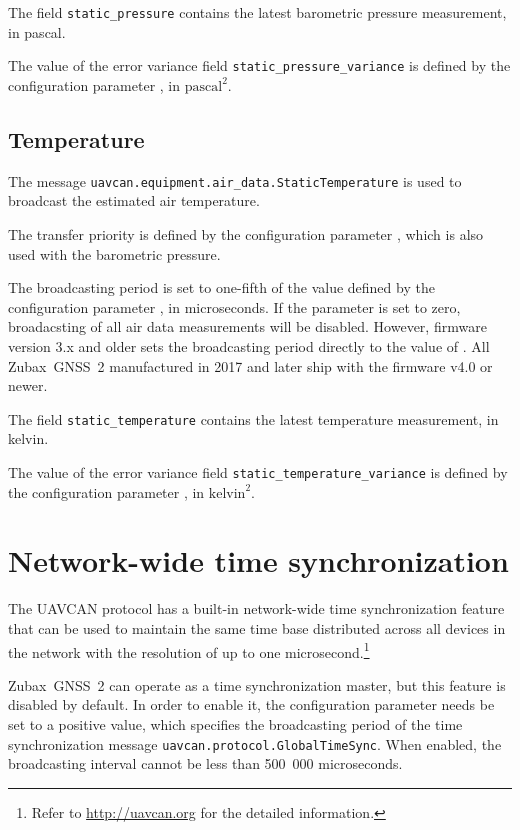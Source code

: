 \documentclass{zubaxdoc}
\begin{document}
The field \verb|static_pressure| contains the latest barometric pressure measurement, in pascal.

The value of the error variance field \verb|static_pressure_variance| is defined by the configuration
parameter , in $\text{pascal}^2$.

\subsection{Temperature}

The message \verb|uavcan.equipment.air_data.StaticTemperature| is used to broadcast the
estimated air temperature.

The transfer priority is defined by the configuration parameter ,
which is also used with the barometric pressure.

The broadcasting period is set to one-fifth of the value defined by the configuration
parameter , in microseconds.
If the parameter is set to zero, broadacsting of all air data measurements will be disabled.
However, firmware version 3.x and older sets the broadcasting period directly to the value
of .
All Zubax~GNSS~2 manufactured in 2017 and later ship with the firmware v4.0 or newer.

The field \verb|static_temperature| contains the latest temperature measurement, in kelvin.

The value of the error variance field \verb|static_temperature_variance| is defined by the configuration
parameter , in $\text{kelvin}^2$.

\section{Network-wide time synchronization}

The UAVCAN protocol has a built-in network-wide time synchronization feature
that can be used to maintain the same time base distributed across all devices in the network
with the resolution of up to one
microsecond.\footnote{Refer to \url{http://uavcan.org} for the detailed information.}

Zubax~GNSS~2 can operate as a time synchronization master, but this feature is disabled by default.
In order to enable it, the configuration parameter  needs be set to a
positive value, which specifies the broadcasting period of the time synchronization message
\verb|uavcan.protocol.GlobalTimeSync|.
When enabled, the broadcasting interval cannot be less than 500~000 microseconds.
\end{document}
